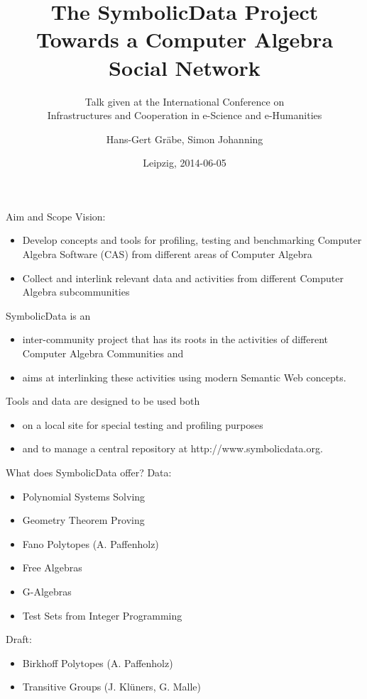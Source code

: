 \documentclass{beamer}
\title[The SymbolicData Project]{The SymbolicData Project\\ Towards a
  Computer Algebra Social Network}
\subtitle{Talk given at the International Conference on\\ Infrastructures and
  Cooperation in e-Science and e-Humanities}
\author[Gr\"abe, Johanning]{Hans-Gert Gr\"abe, Simon Johanning}
\institute[Uni Leipzig]{Leipzig University, Germany\\
\texttt{http://bis.informatik.uni-leipzig.de/HansGertGraebe}}
\date{Leipzig, 2014-06-05}
\begin{document}
\begin{frame}
\maketitle
\end{frame}
\begin{frame}{Aim and Scope}{}
Vision:
\begin{itemize}
\item Develop concepts and tools for profiling, testing and benchmarking
  Computer Algebra Software (CAS) from different areas of Computer Algebra
\item Collect and interlink relevant data and activities from different
  Computer Algebra subcommunities
\end{itemize}
{SymbolicData is an}
\begin{itemize}
\item inter-community project that has its roots in the activities of
  different Computer Algebra Communities and
\item aims at interlinking these activities using modern Semantic Web
  concepts. 
\end{itemize}
{Tools and data are designed to be used both}
\begin{itemize}
\item on a local site for special testing and profiling purposes
\item and to manage a central repository at http://www.symbolicdata.org.
\end{itemize}
\end{frame}

\begin{frame}{What does SymbolicData offer?}{}
Data:
\begin{itemize}
\item Polynomial Systems Solving
\item Geometry Theorem Proving
\item Fano Polytopes (A. Paffenholz)
\item Free Algebras
\item G-Algebras
\item Test Sets from Integer Programming
\end{itemize}
{Draft:}
\begin{itemize}
\item Birkhoff Polytopes (A. Paffenholz)
\item Transitive Groups (J. Kl\"uners, G. Malle)
\end{itemize}
\end{frame}
\end{document}
